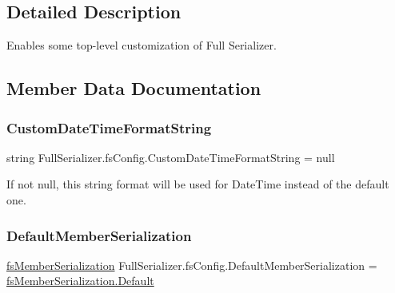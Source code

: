 \subsection{Detailed Description}
Enables some top-\/level customization of Full Serializer. 



\subsection{Member Data Documentation}
\mbox{\label{class_full_serializer_1_1fs_config_acc1c69dd448abc82e44e583cbccbacb4}} 
\subsubsection{\texorpdfstring{Custom\+Date\+Time\+Format\+String}{CustomDateTimeFormatString}}
{\footnotesize\ttfamily string Full\+Serializer.\+fs\+Config.\+Custom\+Date\+Time\+Format\+String = null}



If not null, this string format will be used for Date\+Time instead of the default one. 

\mbox{\label{class_full_serializer_1_1fs_config_a6fc2b4e7460aeb38f38df78273bf2788}} 
\subsubsection{\texorpdfstring{Default\+Member\+Serialization}{DefaultMemberSerialization}}
{\footnotesize\ttfamily \hyperlink{namespace_full_serializer_ad0dc98cd54a3d07f8c579d82585906f8}{fs\+Member\+Serialization} Full\+Serializer.\+fs\+Config.\+Default\+Member\+Serialization = \hyperlink{namespace_full_serializer_ad0dc98cd54a3d07f8c579d82585906f8a7a1920d61156abc05a60135aefe8bc67}{fs\+Member\+Serialization.\+Default}}




